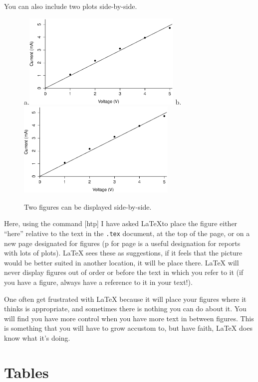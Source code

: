 \documentclass[11pt,letterpaper]{article} %
\begin{document}
You can also include two plots side-by-side.
\begin{figure}[hbp]
\centering 
a.\includegraphics[width = 3.0in]{dummylabplot.eps}
b.\includegraphics[width = 3.0in]{dummylabplot.eps}
\caption{Two figures can be displayed side-by-side.}
\label{fig:VIcurve2}
\end{figure}

Here, using the command [htp] I have asked \LaTeX to place the figure either ``here'' relative to the text in the \texttt{.tex} document, at the top of the page, or on a new page designated for figures (p for page is a useful designation for reports with lots of plots). \LaTeX{} sees these as suggestions, if it feels that the picture would be better suited in another location, it will be place there. \LaTeX{} will never display figures out of order or before the text in which you refer to it (if you have a figure, always have a reference to it in your text!).

One often get frustrated with \LaTeX{} because it will place your figures where it thinks is appropriate, and sometimes there is nothing you can do about it. You will find you have more control when you have more text in between figures. This is something that you will have to grow accustom to, but have faith, \LaTeX{} does know what it's doing.



\section{Tables}
\end{document}
